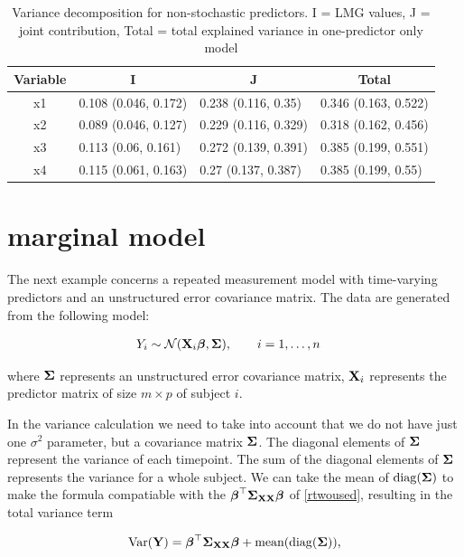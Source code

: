 \documentclass[11pt,a4paper,twoside]{book}
\begin{document}
\begin{table}[h]
\caption{Variance decomposition for non-stochastic predictors. I = LMG values, J = joint contribution, Total = total explained variance in one-predictor only model}
\centering
\begin{tabular}{clll}
  \toprule
  \multicolumn{1}{c}{\textbf{Variable}} & \multicolumn{1}{c}{\textbf{I}} &\multicolumn{1}{c}{\textbf{J}} & \multicolumn{1}{c}{\textbf{Total}} \\
  \hline
x1 & 0.108 (0.046, 0.172)  & 0.238 (0.116, 0.35)   & 0.346 (0.163, 0.522)  \\ 
x2 & 0.089 (0.046, 0.127)  & 0.229 (0.116, 0.329)   & 0.318 (0.162, 0.456)  \\ 
x3 & 0.113 (0.06, 0.161)  & 0.272 (0.139, 0.391)   & 0.385 (0.199, 0.551)  \\ 
x4 & 0.115 (0.061, 0.163)  & 0.27 (0.137, 0.387)   & 0.385 (0.199, 0.55)  \\ 
   \bottomrule
\end{tabular}
\label{tbl:repeatedcormod.tot}
\end{table}



\section{marginal  model}

The next example concerns a repeated measurement model with time-varying predictors and an unstructured error covariance matrix. The data are generated from the following model:

\begin{align} 
&Y_{i} \sim \mathcal{N}({\mathbf{X}}_{i} {\boldsymbol{\beta}}, {\boldsymbol{\Sigma}}{}), \qquad i = 1, \dots, n
\end{align} 

where ${\boldsymbol{\Sigma}}{}$ represents an unstructured error covariance matrix, ${\mathbf{X}}_{i}$ represents the predictor matrix of size $m \times p$ of subject $i$.

In the variance calculation we need to take into account that we do not have just one $\sigma^2$ parameter, but a covariance matrix ${\boldsymbol{\Sigma}}{}$. The diagonal elements of ${\boldsymbol{\Sigma}}{}$ represent the variance of each timepoint. The sum of the diagonal elements of ${\boldsymbol{\Sigma}}{}$ represents the variance for a whole subject. We can  take the mean of $\operatorname{diag}({\boldsymbol{\Sigma}}{})$ to make the formula compatiable with the ${\boldsymbol{\beta}}^\top {\boldsymbol{\Sigma}}{}_{{\mathbf{X}} {\mathbf{X}}}  {\boldsymbol{\beta}}$ of \eqref{rtwoused}, resulting in the total variance term

      \begin{align} 
        \operatorname{Var}({\mathbf{Y}}) = {\boldsymbol{\beta}}^\top {\boldsymbol{\Sigma}}{}_{{\mathbf{X}} {\mathbf{X}}}  {\boldsymbol{\beta}} + \text{mean}(\operatorname{diag}({\boldsymbol{\Sigma}}{})),
   \end{align}
\end{document}
